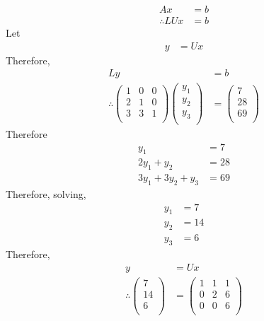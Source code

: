 \documentclass[fleqn, a4paper, 11pt, oneside]{amsart}
\theoremstyle{definition}
\theoremstyle{theorem}
\begin{document}
\begin{solution}
\begin{enumerate}[leftmargin=*]
			\begin{align*}
				A x              & = b \\
				\therefore L U x & = b
			\end{align*}
			Let
			\begin{align*}
				y & = U x
			\end{align*}
			Therefore,
			\begin{align*}
				L y &= b\\
				\therefore
					\begin{pmatrix}
						1 & 0 & 0 \\
						2 & 1 & 0 \\
						3 & 3 & 1 \\
					\end{pmatrix}
					\begin{pmatrix}
						y_1 \\
						y_2 \\
						y_3 \\
					\end{pmatrix}
				&=
					\begin{pmatrix}
						7  \\
						28 \\
						69 \\
					\end{pmatrix}
			\end{align*}
			Therefore
			\begin{align*}
				y_1                 & = 7  \\
				2 y_1 + y_2         & = 28 \\
				3 y_1 + 3 y_2 + y_3 & = 69
			\end{align*}
			Therefore, solving,
			\begin{align*}
				y_1 & = 7  \\
				y_2 & = 14 \\
				y_3 & = 6
			\end{align*}
			Therefore,
			\begin{align*}
				y &= U x\\
				\therefore
					\begin{pmatrix}
						7  \\
						14 \\
						6  \\
					\end{pmatrix}
				&=
					\begin{pmatrix}
						1 & 1 & 1 \\
						0 & 2 & 6 \\
						0 & 0 & 6 \\

\end{pmatrix}
\end{align*}
\end{enumerate}
\end{solution}
\end{document}
